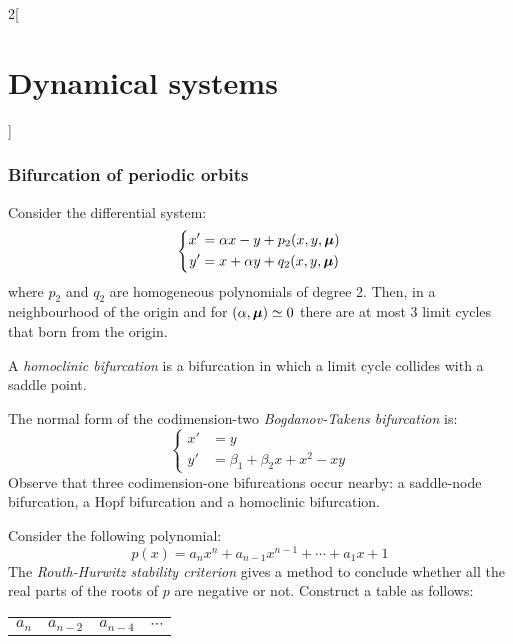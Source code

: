 \documentclass[../../../main_math.tex]{subfiles}
\begin{document}
\begin{multicols}{2}[\section{Dynamical systems}]
  \subsubsection{Bifurcation of periodic orbits}
  \begin{theorem}
    Consider the differential system:
    \begin{equation}
      \left\{
      \begin{aligned}
        x' & =\alpha x-y + p_2(x,y,\boldsymbol{\mathrm{\mu}}) \\
        y' & =x+ \alpha y +q_2(x,y,\boldsymbol{\mathrm{\mu}})
      \end{aligned}
      \right.
    \end{equation}
    where $p_2$ and $q_2$ are homogeneous polynomials of degree 2. Then, in a neighbourhood of the origin and for $(\alpha,\boldsymbol{\mathrm{\mu}})\simeq 0$ there are at most 3 limit cycles that born from the origin.
  \end{theorem}
  \begin{definition}
    A \emph{homoclinic bifurcation} is a bifurcation in which a limit cycle collides with a saddle point.
  \end{definition}
  \begin{theorem}
    The normal form of the codimension-two \emph{Bogdanov-Takens bifurcation} is:
    \begin{equation}
      \left\{
      \begin{aligned}
        x' & =y                       \\
        y' & =\beta_1+\beta_2x+x^2-xy
      \end{aligned}
      \right.
    \end{equation}
    Observe that three codimension-one bifurcations occur nearby: a saddle-node bifurcation, a Hopf bifurcation and a homoclinic bifurcation.
  \end{theorem}
  \begin{proposition}
    Consider the following polynomial: $$p(x)=a_nx^n+a_{n-1}x^{n-1}+\cdots+a_1x+1$$
    The \emph{Routh-Hurwitz stability criterion} gives a method to conclude whether all the real parts of the roots of $p$ are negative or not. Construct a table as follows:
    \begin{center}
      \def\arraystretch{1}
      \begin{tabular}{|c|c|c|c|}
        \hline
        $a_n$     & $a_{n-2}$ & $a_{n-4}$ & $\cdots$ \\

\end{tabular}
\end{center}
\end{proposition}
\end{multicols}
\end{document}
